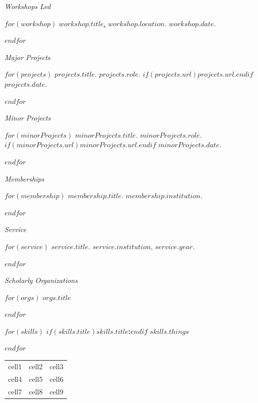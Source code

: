 \documentclass[11pt,article,oneside]{memoir}
\begin{document}
\ind \emph{Workshops Led}

\smallskip

$for(workshop)$
\ind \href{$workshop.url$}{$workshop.title$.} $workshop.location$. $workshop.date$.

\smallskip
$endfor$

\bigskip
\pagebreak[1]


\ind \emph{Major Projects}

\smallskip

$for(projects)$
\ind \emph{$projects.title$}. $projects.role$. $if(projects.url)$\href{$projects.url$}{$projects.url$}.$endif$ $projects.date$.

\smallskip
$endfor$

\bigskip
\pagebreak[1]
\ind \emph{Minor Projects}

\smallskip

$for(minorProjects)$
\ind \emph{$minorProjects.title$}. $minorProjects.role$. $if(minorProjects.url)$\href{$minorProjects.url$}{$minorProjects.url$}.$endif$ $minorProjects.date$.

\smallskip
$endfor$

\bigskip
\pagebreak[1]


\ind \emph{Memberships}

\smallskip

$for(membership)$
\ind $membership.title$. $membership.institution$.

\smallskip

$endfor$

\medskip
\pagebreak[1]
\ind \emph{Service}

\smallskip

$for(service)$
\ind $service.title$. $service.institution$, $service.year$.

\smallskip

$endfor$

\medskip

\ind \emph{Scholarly Organizations}

\smallskip

$for(orgs)$
\ind $orgs.title$

\pagebreak[1]
$endfor$

\medskip

\bigskip


$for(skills)$
\ind$if(skills.title)$\textbf{$skills.title$:}$endif$ $skills.things$

\smallskip
\pagebreak[1]
$endfor$

\bigskip

\begin{center}
	\begin{tabular}{ c c c }
	 cell1 & cell2 & cell3 \\ 
	 cell4 & cell5 & cell6 \\  
	 cell7 & cell8 & cell9    
	\end{tabular}
	\end{center}
\thispagestyle{jtmcolophon}
\end{document}
